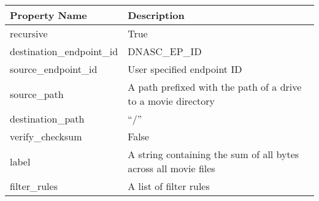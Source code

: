 \begin{tabular}{p{4cm}p{6cm}}
\toprule
 Property Name           & Description                                                     \\
\midrule
 recursive               & True                                                            \\
 destination\_endpoint\_id & DNASC\_EP\_ID                                                     \\
 source\_endpoint\_id      & User specified endpoint ID                                      \\
 source\_path             & A path prefixed with the path of a drive to a movie directory   \\
 destination\_path        & ``/''                                                           \\
 verify\_checksum         & False                                                           \\
 label                   & A string containing the sum of all bytes across all movie files \\
 filter\_rules            & A list of filter rules                                          \\
\bottomrule
\end{tabular}